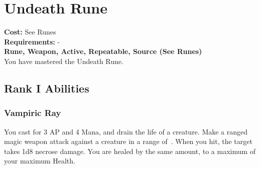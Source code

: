 \section{Undeath Rune}\label{rune:undeath}
\textbf{Cost:} See Runes\\
\textbf{Requirements:} -\\
\textbf{Rune, Weapon, Active, Repeatable, Source (See Runes)}\\
You have mastered the Undeath Rune.

\subsection{Rank I Abilities}

\subsubsection{Vampiric Ray}
You cast for 3 AP and 4 Mana, and drain the life of a creature.
Make a ranged magic weapon attack against a creature in a range of~.
When you hit, the target takes 1d8 necrose damage.
You are healed by the same amount, to a maximum of your maximum Health.